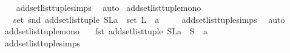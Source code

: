 \begin{isabellebody}
%
\isadelimproof
\ \ %
\endisadelimproof
%
\isatagproof
{}\isamarkupfalse%
\ add{\isacharunderscore}{\kern0pt}set{\isacharunderscore}{\kern0pt}list{\isacharunderscore}{\kern0pt}tuple{\isachardot}{\kern0pt}simps\ \isamarkupfalse%
\ auto%
\endisatagproof
{\isafoldproof}%
%
\isadelimproof
\isanewline
%
\endisadelimproof
\isanewline
{}\isamarkupfalse%
\ add{\isacharunderscore}{\kern0pt}set{\isacharunderscore}{\kern0pt}list{\isacharunderscore}{\kern0pt}tuple{\isacharunderscore}{\kern0pt}mono{}{\isacharcolon}{\kern0pt}\isanewline
\ \ \ {\isachardoublequoteopen}set\ {\isacharparenleft}{\kern0pt}snd\ {\isacharparenleft}{\kern0pt}add{\isacharunderscore}{\kern0pt}set{\isacharunderscore}{\kern0pt}list{\isacharunderscore}{\kern0pt}tuple\ {\isacharparenleft}{\kern0pt}{\isacharparenleft}{\kern0pt}S{\isacharcomma}{\kern0pt}L{\isacharparenright}{\kern0pt}{\isacharcomma}{\kern0pt}a{\isacharparenright}{\kern0pt}{\isacharparenright}{\kern0pt}{\isacharparenright}{\kern0pt}\ {\isasymsubseteq}\ set\ L\ {\isasymunion}\ {\isacharbraceleft}{\kern0pt}a{\isacharbraceright}{\kern0pt}\ {\isachardoublequoteclose}\isanewline
%
\isadelimproof
\ \ %
\endisadelimproof
%
\isatagproof
{}\isamarkupfalse%
\ add{\isacharunderscore}{\kern0pt}set{\isacharunderscore}{\kern0pt}list{\isacharunderscore}{\kern0pt}tuple{\isachardot}{\kern0pt}simps\ \isamarkupfalse%
\ auto%
\endisatagproof
{\isafoldproof}%
%
\isadelimproof
\isanewline
%
\endisadelimproof
\isanewline
{}\isamarkupfalse%
\ add{\isacharunderscore}{\kern0pt}set{\isacharunderscore}{\kern0pt}list{\isacharunderscore}{\kern0pt}tuple{\isacharunderscore}{\kern0pt}mono{}{\isacharcolon}{\kern0pt}\isanewline
\ \ \ {\isachardoublequoteopen}{\isacharparenleft}{\kern0pt}fst\ {\isacharparenleft}{\kern0pt}add{\isacharunderscore}{\kern0pt}set{\isacharunderscore}{\kern0pt}list{\isacharunderscore}{\kern0pt}tuple\ {\isacharparenleft}{\kern0pt}{\isacharparenleft}{\kern0pt}S{\isacharcomma}{\kern0pt}L{\isacharparenright}{\kern0pt}{\isacharcomma}{\kern0pt}a{\isacharparenright}{\kern0pt}{\isacharparenright}{\kern0pt}{\isacharparenright}{\kern0pt}\ {\isasymsubseteq}\ S\ {\isasymunion}\ {\isacharbraceleft}{\kern0pt}a{\isacharbraceright}{\kern0pt}\ {\isachardoublequoteclose}\isanewline
%
\isadelimproof
\ \ %
\endisadelimproof
%
\isatagproof
{}\isamarkupfalse%
\ add{\isacharunderscore}{\kern0pt}set{\isacharunderscore}{\kern0pt}list{\isacharunderscore}{\kern0pt}tuple{\isachardot}{\kern0pt}simps\ \isamarkupfalse%

\end{isabellebody}
